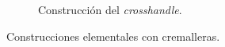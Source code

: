\documentclass[10pt]{report}
\theoremstyle{definition}
\begin{document}
\begin{figure}
\begin{subfigure}{1\textwidth}
\begin{tikzpicture}[use optics, scale=1.2]
\end{tikzpicture}
\caption{Construcción del \textit{crosshandle}.\label{fig:crosshandle}}
\end{subfigure}
\caption{Construcciones elementales con cremalleras.}
\end{figure}

%
%
%
%
%

\end{document}
